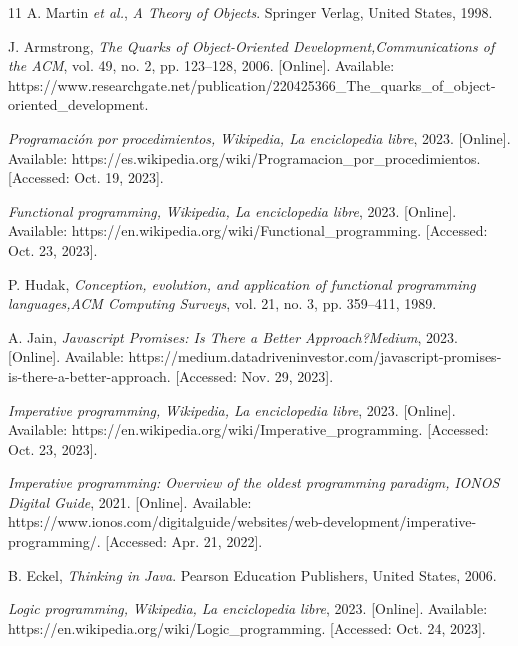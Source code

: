 \begin{thebibliography}{11}
    \label{sec:48}
    \hypertarget{48}{}
    A. Martin \textit{et al.}, \textit{A Theory of Objects}. Springer Verlag, United States, 1998.

    \label{sec:49}
    \hypertarget{49}{}
    J. Armstrong, \textit{The Quarks of Object-Oriented Development,}\textit{Communications of the ACM}, vol. 49, no. 2, pp. 123–128, 2006. [Online]. Available: https://www.researchgate.net/publication/220425366\_The\_quarks\_of\_object-oriented\_development.

    \label{sec:50}
    \hypertarget{50}{}
    \textit{Programación por procedimientos, }\textit{Wikipedia, La enciclopedia libre}, 2023. [Online]. Available: https://es.wikipedia.org/wiki/Programacion\_por\_procedimientos. [Accessed: Oct. 19, 2023].

    \label{sec:51}
    \hypertarget{51}{}
    \textit{Functional programming, }\textit{Wikipedia, La enciclopedia libre}, 2023. [Online]. Available: https://en.wikipedia.org/wiki/Functional\_programming. [Accessed: Oct. 23, 2023].
    
    \label{sec:52}
    \hypertarget{52}{}
    P. Hudak, \textit{Conception, evolution, and application of functional programming languages,}\textit{ACM Computing Surveys}, vol. 21, no. 3, pp. 359–411, 1989.

    \label{sec:53}
    \hypertarget{53}{}
    A. Jain, \textit{Javascript Promises: Is There a Better Approach?}\textit{Medium}, 2023. [Online]. Available: https://medium.datadriveninvestor.com/javascript-promises-is-there-a-better-approach. [Accessed: Nov. 29, 2023].

    \label{sec:54}
    \hypertarget{54}{}
    \textit{Imperative programming, }\textit{Wikipedia, La enciclopedia libre}, 2023. [Online]. Available: https://en.wikipedia.org/wiki/Imperative\_programming. [Accessed: Oct. 23, 2023].

    \label{sec:55}
    \hypertarget{55}{}
    \textit{Imperative programming: Overview of the oldest programming paradigm, }\textit{IONOS Digital Guide}, 2021. [Online]. Available: https://www.ionos.com/digitalguide/websites/web-development/imperative-programming/. [Accessed: Apr. 21, 2022].

    \label{sec:56}
    \hypertarget{56}{}
    B. Eckel, \textit{Thinking in Java}. Pearson Education Publishers,  United States, 2006.

    \label{sec:57}
    \hypertarget{57}{}
    \textit{Logic programming, }\textit{Wikipedia, La enciclopedia libre}, 2023. [Online]. Available: https://en.wikipedia.org/wiki/Logic\_programming. [Accessed: Oct. 24, 2023].


\end{thebibliography}
